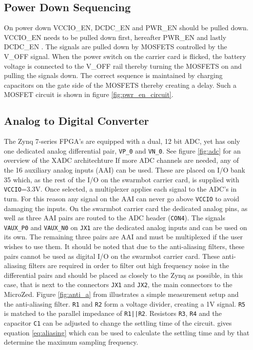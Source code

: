 \subsection{Power Down Sequencing}
On power down VCCIO\_EN, DCDC\_EN and PWR\_EN should be pulled down. 
VCCIO\_EN needs to be pulled down first, hereafter PWR\_EN and lastly DCDC\_EN .
The signals are pulled down by MOSFETS controlled by the V\_OFF signal.
When the power switch on the carrier card is flicked, the battery voltage is connected to the V\_OFF rail thereby turning the MOSFETS on and pulling the signals down. 
The correct sequence is maintained by charging capacitors on the gate side of the MOSFETS thereby creating a delay.
Such a MOSFET circuit is shown in figure \ref{fig:pwr_en_circuit}.

\subsection{Analog to Digital Converter}
The Zynq 7-series FPGA's are equipped with a dual, 12 bit ADC, yet has only one dedicated analog differential pair, \texttt{VP\_0} and \texttt{VN\_0}.
See figure \ref{fig:adc} for an overview of the XADC architechture
If more ADC channels are needed, any of the 16 auxiliary analog inputs (AAI) can be used.
These are placed on I/O bank 35 which, as the rest of the I/O on the swarmbot carrier card, is supplied with \texttt{VCCIO}=3.3V.
Once selected, a multiplexer applies each signal to the ADC's in turn.
For this reason any signal on the AAI can never go above \texttt{VCCIO} to avoid damaging the inputs.
On the swarmbot carrier card the dedicated analog pins, as well as three AAI pairs are routed to the ADC header (\texttt{CON4}).
The signals \texttt{VAUX\_P0} and \texttt{VAUX\_N0} on \texttt{JX1} are the dedicated analog inputs and can be used on its own.
The remaining three pairs are AAI and must be multiplexed if the user wishes to use them.
It should be noted that due to the anti-aliasing filters, these pairs cannot be used as digital I/O on the swarmbot carrier card.
These anti-aliasing filters are required in order to filter out high frequency noise in the differential pairs and should be placed as closely to the Zynq as possible, in this case, that is next to the connectors \texttt{JX1} and \texttt{JX2}, the main connectors to the MicroZed.
Figure \ref{fig:anti_a} from \cite{adch} illustrates a simple measurement setup and the anti-aliasing filter.
\texttt{R1} and \texttt{R2} form a voltage divider, creating a 1V signal.
\texttt{R5} is matched to the parallel impedance of \texttt{R1||R2}.
Resistors \texttt{R3}, \texttt{R4} and the capacitor \texttt{C1} can be adjusted to change the settling time of the circuit.
\cite{adc} gives equation \ref{eq:aliasing} which can be used to calculate the settling time and by that determine the maximum sampling frequency.

